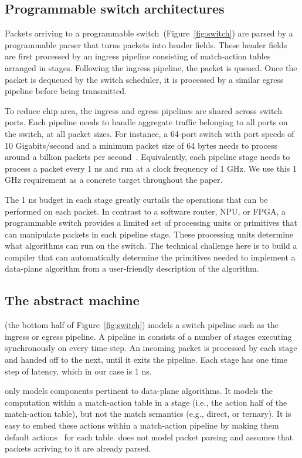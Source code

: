 \subsection{Programmable switch architectures}
Packets arriving to a programmable switch~(Figure~\ref{fig:switch}) are parsed
by a programmable parser that turns packets into header fields. These header
fields are first processed by an ingress pipeline consisting of match-action
tables arranged in stages.  Following the ingress pipeline, the packet is
queued. Once the packet is dequeued by the switch scheduler, it is processed by
a similar egress pipeline before being transmitted.

To reduce chip area, the ingress and egress pipelines are shared across switch
ports.  Each pipeline needs to handle aggregate traffic belonging to all ports
on the switch, at all packet sizes. For instance, a 64-port switch with port
speeds of 10 Gigabits/second and a minimum packet size of 64 bytes needs to
process around a billion packets per second~\cite{rmt}.  Equivalently, each
pipeline stage needs to process a packet every 1 ns and run at a clock
frequency of 1 GHz. We use this 1 GHz requirement as a concrete target
throughout the paper.

The 1 ns budget in each stage greatly curtails the operations that can be
performed on each packet. In contrast to a software router, NPU, or FPGA, a
programmable switch provides a limited set of processing units or primitives
that can manipulate packets in each pipeline stage. These processing units
determine what algorithms can run on the switch. The technical challenge here
is to build a compiler that can automatically determine the primitives needed
to implement a data-plane algorithm from a user-friendly description of the
algorithm.

\subsection{The \absmachine abstract machine}

\absmachine (the bottom half of Figure~\ref{fig:switch}) models a switch
pipeline such as the ingress or egress pipeline. A pipeline in \absmachine
consists of a number of stages executing synchronously on every time step. An
incoming packet is processed by each stage and handed off to the next, until it
exits the pipeline. Each stage has one time step of latency, which in our case
is 1 ns.

\absmachine only models components pertinent to data-plane algorithms. It
models the computation within a match-action table in a stage (i.e., the action
half of the match-action table), but not the match semantics (e.g., direct, or
ternary). It is easy to embed these actions within a match-action pipeline by
making them default actions~\cite{p4spec} for each table. \absmachine does not
model packet parsing and assumes that packets arriving to it are already
parsed.

